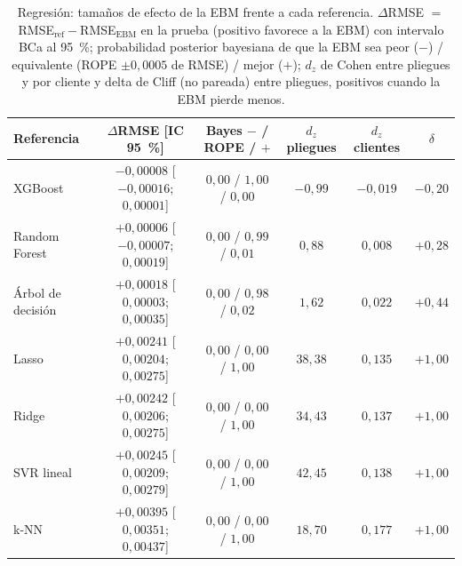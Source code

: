 \begin{table}[tbp]
  \centering\small\setlength{\tabcolsep}{3pt}
  \caption{Regresión: tamaños de efecto de la EBM frente a cada referencia. $\Delta$RMSE $=$ RMSE$_{\mathrm{ref}} - $RMSE$_{\mathrm{EBM}}$ en la prueba (positivo favorece a la EBM) con intervalo BCa al 95~\%; probabilidad posterior bayesiana de que la EBM sea peor ($-$) / equivalente (ROPE $\pm 0{,}0005$ de RMSE) / mejor ($+$); $d_z$ de Cohen entre pliegues y por cliente y delta de Cliff (no pareada) entre pliegues, positivos cuando la EBM pierde menos.}
  \label{tab:efectos_regresion}
  \begin{tabular}{@{}l c c c c c@{}}
    \toprule
    Referencia & $\Delta$RMSE [IC 95~\%] & Bayes $-$ / ROPE / $+$ & $d_z$ pliegues & $d_z$ clientes & $\delta$ \\
    \midrule
    XGBoost & $-0{,}00008$ [$-0{,}00016$; $0{,}00001$] & $0{,}00$ / $1{,}00$ / $0{,}00$ & $-0{,}99$ & $-0{,}019$ & $-0{,}20$ \\
    Random Forest & $+0{,}00006$ [$-0{,}00007$; $0{,}00019$] & $0{,}00$ / $0{,}99$ / $0{,}01$ & $0{,}88$ & $0{,}008$ & $+0{,}28$ \\
    Árbol de decisión & $+0{,}00018$ [$0{,}00003$; $0{,}00035$] & $0{,}00$ / $0{,}98$ / $0{,}02$ & $1{,}62$ & $0{,}022$ & $+0{,}44$ \\
    Lasso & $+0{,}00241$ [$0{,}00204$; $0{,}00275$] & $0{,}00$ / $0{,}00$ / $1{,}00$ & $38{,}38$ & $0{,}135$ & $+1{,}00$ \\
    Ridge & $+0{,}00242$ [$0{,}00206$; $0{,}00275$] & $0{,}00$ / $0{,}00$ / $1{,}00$ & $34{,}43$ & $0{,}137$ & $+1{,}00$ \\
    SVR lineal & $+0{,}00245$ [$0{,}00209$; $0{,}00279$] & $0{,}00$ / $0{,}00$ / $1{,}00$ & $42{,}45$ & $0{,}138$ & $+1{,}00$ \\
    k-NN & $+0{,}00395$ [$0{,}00351$; $0{,}00437$] & $0{,}00$ / $0{,}00$ / $1{,}00$ & $18{,}70$ & $0{,}177$ & $+1{,}00$ \\
    \bottomrule
  \end{tabular}
\end{table}
